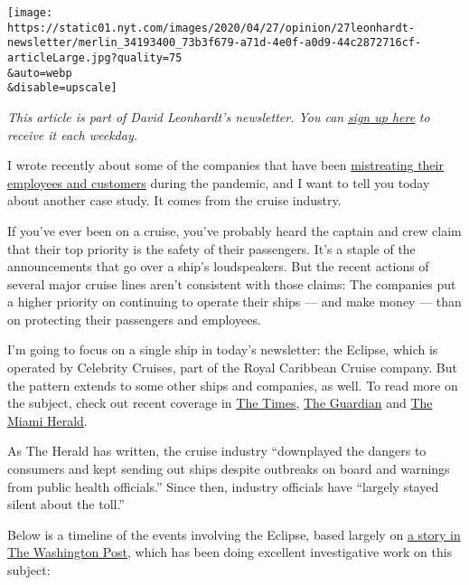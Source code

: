 \texttt{[image: https://static01.nyt.com/images/2020/04/27/opinion/27leonhardt-newsletter/merlin\_34193400\_73b3f679-a71d-4e0f-a0d9-44c2872716cf-articleLarge.jpg?quality=75\\\&auto=webp\\\&disable=upscale]}

\emph{This article is part of David Leonhardt's newsletter. You can}
\href{https://www.nytimes.com/newsletters/opiniontoday?action=click\&module=Intentional\&pgtype=Article}{\emph{sign
up here}} \emph{to receive it each weekday.}

I wrote recently about some of the companies that have been
\href{https://www.nytimes.com/2020/04/17/opinion/business-coronavirus.html}{mistreating
their employees and customers} during the pandemic, and I want to tell
you today about another case study. It comes from the cruise industry.

If you've ever been on a cruise, you've probably heard the captain and
crew claim that their top priority is the safety of their passengers.
It's a staple of the announcements that go over a ship's loudspeakers.
But the recent actions of several major cruise lines aren't consistent
with those claims: The companies put a higher priority on continuing to
operate their ships --- and make money --- than on protecting their
passengers and employees.

I'm going to focus on a single ship in today's newsletter: the Eclipse,
which is operated by Celebrity Cruises, part of the Royal Caribbean
Cruise company. But the pattern extends to some other ships and
companies, as well. To read more on the subject, check out recent
coverage in
\href{https://www.nytimes.com/2020/03/27/us/coronavirus-cruise-ships-zandaam.html}{The
Times},
\href{https://www.theguardian.com/environment/2020/apr/09/revealed-6000-passengers-on-cruise-ships-at-sea-despite-coronavirus-crisis}{The
Guardian} and
\href{https://www.miamiherald.com/news/business/tourism-cruises/article241640166.html}{The
Miami Herald}.

As The Herald has written, the cruise industry ``downplayed the dangers
to consumers and kept sending out ships despite outbreaks on board and
warnings from public health officials.'' Since then, industry officials
have ``largely stayed silent about the toll.''

Below is a timeline of the events involving the Eclipse, based largely
on
\href{https://www.washingtonpost.com/graphics/2020/politics/cruise-ships-coronavirus/?nid=top_pb_signin}{a
story in The Washington Post}, which has been doing excellent
investigative work on this subject:

